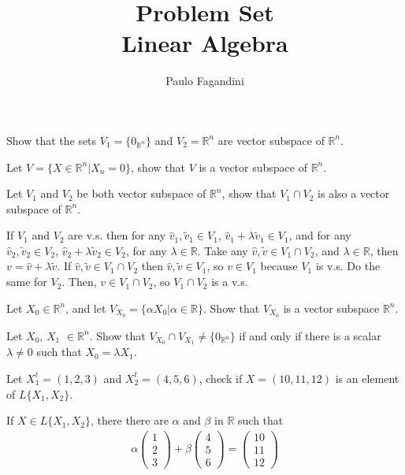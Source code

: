 \documentclass[answers]{exam}
\title{Problem Set \\ Linear Algebra}
\author{Paulo Fagandini}
\date{}
\begin{document}
\maketitle

\begin{questions}

\question Show that the sets $V_1=\{0_{\mathbb{R}^n}\}$ and $V_2=\mathbb{R}^n$ are vector subspace of $\mathbb{R}^n$.

\question Let $V=\{X\in\mathbb{R}^n|X_n=0\}$, show that $V$ is a vector subspace of $\mathbb{R}^n$.

\question Let $V_1$ and $V_2$ be both vector subspace of $\mathbb{R}^n$, show that $V_1\cap V_2$ is also a vector subspace of $\mathbb{R}^n$.
\begin{solution}
    If $V_1$ and $V_2$ are v.s. then for any $\hat{v}_1,\tilde{v}_1\in V_1$, $\hat{v}_1+\lambda \tilde{v}_1\in V_1$, and for any $\hat{v}_2,\tilde{v}_2\in V_2$, $\hat{v}_2+\lambda \tilde{v}_2\in V_2$, for any $\lambda\in\mathbb{R}$. Take any $\hat{v},\tilde{v} \in V_1\cap V_2$, and $\lambda\in\mathbb{R}$, then $v=\hat{v}+\lambda\tilde{v}$. If $\hat{v},\tilde{v}\in V_1\cap V_2$ then $\hat{v},\tilde{v}\in V_1$, so $v\in V_1$ because $V_1$ is v.s. Do the same for $V_2$. Then, $v\in V_1\cap V_2$, so $V_1\cap V_2$ is a v.s.
\end{solution}

\question Let $X_0\in\mathbb{R}^n$, and let $V_{X_0}=\{\alpha X_0 | \alpha\in\mathbb{R}\}$. Show that $V_{X_0}$ is a vector subspace $\mathbb{R}^n$.

\question Let $X_0$, $X_1$ $\in\mathbb{R}^n$. Show that $V_{X_0}\cap V_{X_1}\neq\{0_{\mathbb{R}^n}\}$ if and only if there is a scalar $\lambda\neq0$ such that $X_0=\lambda X_1$.

\question Let $X_1^t=(1,2,3)$ and $X_2^t=(4,5,6)$, check if $X=(10,11,12)$ is an element of $L\{X_1,X_2\}$.

\begin{solution}
    If $X\in L\{X_1,X_2\}$, there there are $\alpha$ and $\beta$ in $\mathbb{R}$ such that
    \begin{align*}
        \alpha\left(\begin{array}{c}
             1  \\
             2 \\
             3
        \end{array}\right) +
        \beta\left(\begin{array}{c}
             4  \\
             5 \\
             6
        \end{array}\right) =
        \left(\begin{array}{c}
             10  \\
             11 \\
             12
        \end{array}\right)
    \end{align*}
    

\end{solution}
\end{questions}
\end{document}
